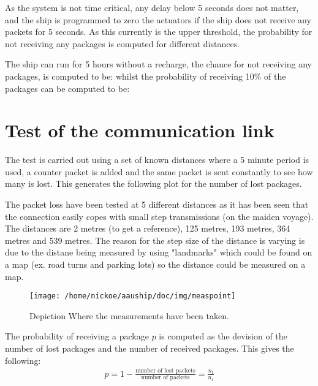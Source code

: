 As the system is not time critical, any delay below 5 seconds does not matter, and the ship is programmed to zero the actuators if the ship does not receive any packets for 5 seconds. As this currently is the upper threshold, the probability for not receiving any packages is computed for different distances. 

The ship can run for 5 hours without a recharge, the chance for not receiving any packages, is computed to be: whilst the probability of receiving 10\% of the packages can be computed to be:

\section{Test of the communication link}

The test is carried out using a set of known distances where a 5 minute period is used, a counter packet is added and the same packet is sent constantly to see how many is lost. This generates the following plot for the number of lost packages. 

The packet loss have been tested at 5 different distances as it has been seen that the connection easily copes with small step transmissions (on the maiden voyage). The distances are 2 metres (to get a reference), 125 metres, 193 metres, 364 metres and 539 metres. The reason for the step size of the distance is varying is due to the distane being measured by using "landmarks" which could be found on a map (ex. road turns and parking lots) so the distance could be measured on a map.

\begin{figure}[htbp]
		\begin{center}
			\texttt{[image: /home/nickoe/aauship/doc/img/measpoint]}
			\caption{Depiction Where the measurements have been taken.}
			\label{fig:mpoint}
		\end{center}
\end{figure}

The probability of receiving a package $p$ is computed as the devision of the number of lost packages and the number of received packages. This gives the following:
\begin{align}
p = 1 - \frac{\text{number of lost packets}}{\text{number of packets}} = \frac{n_\text{l}}{n_\text{r}}
\end{align}


